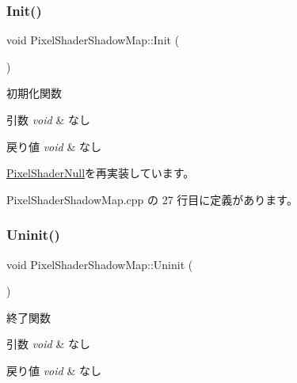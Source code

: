 \subsubsection{\texorpdfstring{Init()}{Init()}}
{\footnotesize\ttfamily void Pixel\+Shader\+Shadow\+Map\+::\+Init (\begin{DoxyParamCaption}{ }\end{DoxyParamCaption})\hspace{0.3cm}{\ttfamily [virtual]}}



初期化関数 


\begin{DoxyParams}{引数}
{\em void} & なし \\
\hline
\end{DoxyParams}

\begin{DoxyRetVals}{戻り値}
{\em void} & なし \\
\hline
\end{DoxyRetVals}


\mbox{\hyperlink{class_pixel_shader_null_a5318be2bf26892c385d863e3e8409571}{Pixel\+Shader\+Null}}を再実装しています。



 Pixel\+Shader\+Shadow\+Map.\+cpp の 27 行目に定義があります。

\mbox{\label{class_pixel_shader_shadow_map_aa95a200a1bf5bd91ffaa526a647818f1}} 
\subsubsection{\texorpdfstring{Uninit()}{Uninit()}}
{\footnotesize\ttfamily void Pixel\+Shader\+Shadow\+Map\+::\+Uninit (\begin{DoxyParamCaption}{ }\end{DoxyParamCaption})\hspace{0.3cm}{\ttfamily [virtual]}}



終了関数 


\begin{DoxyParams}{引数}
{\em void} & なし \\
\hline
\end{DoxyParams}

\begin{DoxyRetVals}{戻り値}
{\em void} & なし \\
\hline
\end{DoxyRetVals}


